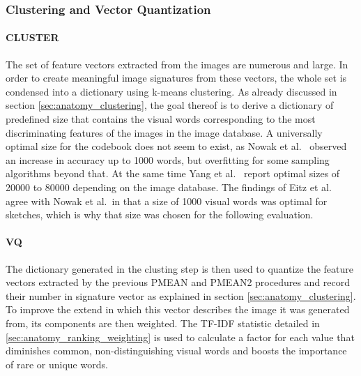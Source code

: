 \subsubsection{Clustering and Vector Quantization}

\paragraph{CLUSTER}

The set of feature vectors extracted from the images are numerous and large.
In order to create meaningful image signatures from these vectors, the whole
set is condensed into a dictionary using k-means clustering. As already
discussed in section \ref{sec:anatomy_clustering}, the goal thereof is to
derive a dictionary of predefined size that contains the visual words
corresponding to the most discriminating features of the images in the image
database. A universally optimal size for the codebook does not seem to exist,
as Nowak et al.\ \autocite{nowak_sampling_2006} observed an increase in accuracy
up to 1000 words, but overfitting for some sampling algorithms beyond that. At
the same time Yang et al.\ \autocite{yang_evaluating_2007} report optimal sizes
of 20000 to 80000 depending on the image database. The findings of Eitz et al.\
\autocite{eitz_sketch-based_2010} agree with Nowak et al.\ in that a size of
1000 visual words was optimal for sketches, which is why that size was chosen
for the following evaluation.

\paragraph{VQ}

The dictionary generated in the clusting step is then used to quantize the
feature vectors extracted by the previous PMEAN and PMEAN2 procedures and
record their number in signature vector as explained in section
\ref{sec:anatomy_clustering}. To improve the extend in which this vector
describes the image it was generated from, its components are then weighted.
The TF-IDF statistic detailed in \ref{sec:anatomy_ranking_weighting} is used to
calculate a factor for each value that diminishes common, non-distinguishing
visual words and boosts the importance of rare or unique words.
